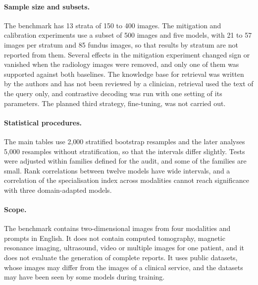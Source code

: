\paragraph{Sample size and subsets.} The benchmark has 13 strata of 150 to 400 images. The mitigation and calibration experiments use a subset of 500 images and five models, with 21 to 57 images per stratum and 85 fundus images, so that results by stratum are not reported from them. Several effects in the mitigation experiment changed sign or vanished when the radiology images were removed, and only one of them was supported against both baselines. The knowledge base for retrieval was written by the authors and has not been reviewed by a clinician, retrieval used the text of the query only, and contrastive decoding was run with one setting of its parameters. The planned third strategy, fine-tuning, was not carried out.

\paragraph{Statistical procedures.} The main tables use 2{,}000 stratified bootstrap resamples and the later analyses 5{,}000 resamples without stratification, so that the intervals differ slightly. Tests were adjusted within families defined for the audit, and some of the families are small. Rank correlations between twelve models have wide intervals, and a correlation of the specialisation index across modalities cannot reach significance with three domain-adapted models.

\paragraph{Scope.} The benchmark contains two-dimensional images from four modalities and prompts in English. It does not contain computed tomography, magnetic resonance imaging, ultrasound, video or multiple images for one patient, and it does not evaluate the generation of complete reports. It uses public datasets, whose images may differ from the images of a clinical service, and the datasets may have been seen by some models during training.
